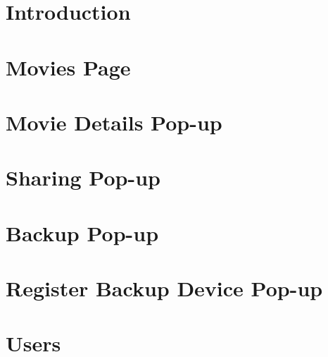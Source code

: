 \documentclass{report}
\begin{document}
\maketitle
{}
\tableofcontents

\clearpage
{}
\chapter{Introduction}


\chapter{Movies Page}


%

\chapter{Movie Details Pop-up}


\chapter{Sharing Pop-up}


\chapter{Backup Pop-up}


\chapter{Register Backup Device Pop-up\label{chapter:registerbackupdevice}}


\chapter{Users}


\appendix

\end{document}
